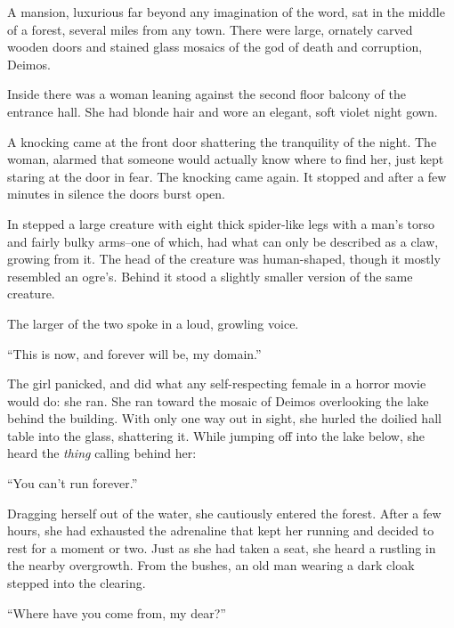 \newcommand{\creaturename}{Orachnid}
\newcommand{\creaturenames}{{\creaturename}s}
\noindent
A mansion, luxurious far beyond any imagination of the word,
sat in the middle of a forest, several miles from any town.
There were large, ornately carved wooden doors and
stained glass mosaics of the god of death and corruption, Deimos.


Inside there was a woman leaning against the second floor balcony
of the entrance hall.
She had blonde hair and wore an elegant, soft violet night gown.


A knocking came at the front door shattering the tranquility of the night.
The woman, alarmed that someone would actually know where to find her,
just kept staring at the door in fear.
The knocking came again.  It stopped and after a few minutes in silence
the doors burst open.


In stepped a large creature with eight thick spider-like legs with a man's
torso and fairly bulky arms--one of which, had what can only be described
as a claw, growing from it.
The head of the creature was human-shaped,
though it mostly resembled an ogre's.
Behind it stood a slightly smaller version of the same creature.


The larger of the two spoke in a loud, growling voice.
\VV


``This is now, and forever will be, my domain.''
\VV


\noindent
The girl panicked, and did what any self-respecting
female in a horror movie would do: she ran.
She ran toward the mosaic of Deimos overlooking the
lake behind the building.
With only one way out in sight,
she hurled the doilied hall table into the glass, shattering it.
While jumping off into the lake below,
she heard the \textit{thing} calling behind her:
\VV


``You can't run forever.''
\VV


\noindent
Dragging herself out of the water, she cautiously entered the forest.
After a few hours, she had exhausted the adrenaline that kept her
running and decided to rest for a moment or two.
Just as she had taken a seat,
she heard a rustling in the nearby overgrowth.
From the bushes, an old man wearing a dark cloak
stepped into the clearing.
\VV


``Where have you come from, my dear?''
\VV


